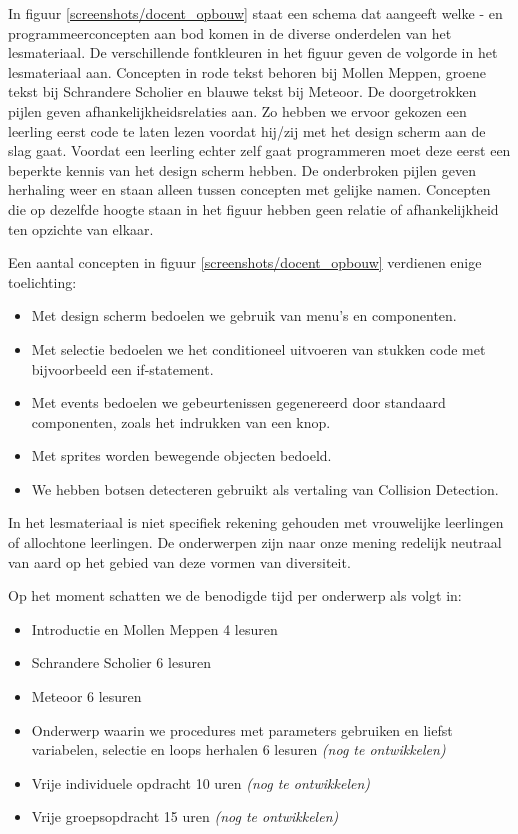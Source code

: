 \documentclass{BYUTextbook}
\begin{document}
In figuur \ref{screenshots/docent_opbouw} staat een schema dat aangeeft welke \ai- en programmeerconcepten aan bod komen in de diverse onderdelen van het lesmateriaal. De verschillende fontkleuren in het figuur geven de volgorde in het lesmateriaal aan. Concepten in rode tekst behoren bij Mollen Meppen, groene tekst bij Schrandere Scholier en blauwe tekst bij Meteoor. De doorgetrokken pijlen geven afhankelijkheidsrelaties aan. Zo hebben we ervoor gekozen een leerling eerst code te laten lezen voordat hij/zij met het design scherm aan de slag gaat. Voordat een leerling echter zelf gaat programmeren moet deze eerst een beperkte kennis van het design scherm hebben. De onderbroken pijlen geven herhaling weer en staan alleen tussen concepten met gelijke namen. Concepten die op dezelfde hoogte staan in het figuur hebben geen relatie of afhankelijkheid ten opzichte van elkaar.

Een aantal concepten in figuur \ref{screenshots/docent_opbouw} verdienen enige toelichting:
\begin{itemize}
  \item Met design scherm bedoelen we gebruik van menu's en componenten.
  \item Met selectie bedoelen we het conditioneel uitvoeren van stukken code met bijvoorbeeld een if-statement.
  \item Met events bedoelen we gebeurtenissen gegenereerd door standaard componenten, zoals het indrukken van een knop.
  \item Met sprites worden bewegende objecten bedoeld.
  \item We hebben botsen detecteren gebruikt als vertaling van Collision Detection.
\end{itemize}
 

In het lesmateriaal is niet specifiek rekening gehouden met vrouwelijke leerlingen of allochtone leerlingen. De onderwerpen zijn naar onze mening redelijk neutraal van aard op het gebied van deze vormen van diversiteit.

Op het moment schatten we de benodigde tijd per onderwerp als volgt in:
\begin{itemize}
  \item Introductie en Mollen Meppen 4 lesuren
  \item Schrandere Scholier 6 lesuren
  \item Meteoor 6 lesuren
  \item Onderwerp waarin we procedures met parameters gebruiken en liefst variabelen, selectie en loops herhalen 6 lesuren \emph{(nog te ontwikkelen)}
  \item Vrije individuele opdracht 10 uren \emph{(nog te ontwikkelen)}
  \item Vrije groepsopdracht 15 uren \emph{(nog te ontwikkelen)}
\end{itemize}
\end{document}
